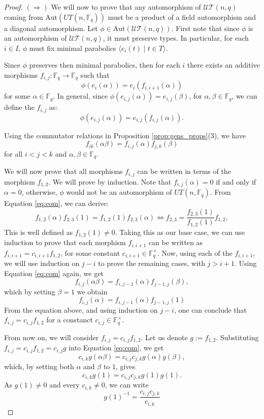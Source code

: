 \documentclass[11pt,letterpaper]{amsart}
\newcommand{\TT}{\mathcal{T}}
\newcommand{\Aut}{\mathrm{Aut}}
\newcommand{\FF}{\mathbb{F}}
\newcommand{\UU}{\mathcal{U}}
\begin{document}
\begin{proof}
$(\Rightarrow)$  We will now to prove that any automorphism of $\UU\TT(n,q)$ coming from $\Aut(UT(n,\FF_q))$ must be a product of a field automorphism and a diagonal automorphism. Let $\phi\in \Aut(\UU\TT(n,q))$. First note that since $\phi$ is an automorphism of $\UU\TT(n,q)$, it must preserve types. In particular, for each $i\in I$, $\phi$ must fix minimal parabolics $\langle e_i(t)\mid t\in T\rangle$.

Since $\phi$ preserves then minimal parabolics, then for each $i$ there exists an additive morphisms $f_{i,j}:\FF_q\to \FF_q$ such that 
$$
\phi(e_i(\alpha))=e_i(f_{i,i+1}(\alpha))
$$
for some $\alpha\in \FF_q$.
In general, since $\phi(e_{i,j}(\alpha))=e_{i,j}(\beta)$, for $\alpha,\beta\in \FF_q$, we can define the $f_{i,j}$ as:
$$
\phi(e_{i,j}(\alpha))=e_{i,j}(f_{i,j}(\alpha)).
$$

Using the commutator relations in Proposition \ref{prop:gens_props}(3), we have
\begin{equation}\label{eq:com}
  f_{ik}(\alpha \beta)=f_{i,j}(\alpha)f_{j,k}(\beta)  
\end{equation}
for all $i<j<k$ and $\alpha,\beta\in\FF_q$.

We will now prove that all morphisms $f_{i,j}$ can be written in terms of the morphism $f_{1,2}$.
We will prove by induction. Note that $f_{i,j}(\alpha) = 0$ if and only if $\alpha = 0$, otherwise, $\phi$ would not be an automorphism of $UT(n,\FF_q)$.
From Equation \ref{eq:com}, we can derive:
$$
f_{1,2}(\alpha)f_{2,3}(1)=f_{1,2}(1)f_{2,3}(\alpha) \Leftrightarrow f_{2,3}=\frac{f_{2,3}(1)}{f_{1,2}(1)}f_{1,2},
$$
This is well defined as $f_{1,2}(1)\neq 0$. Taking this as our base case, we can use induction to prove that each morphism $f_{i,i+1}$ can be written as $f_{i,i+1} = c_{i,i+1} f_{1,2}$, for some constant $c_{i,i+1}\in \FF_q^\times$. 
Now, using each of the $f_{i,i+1}$, we will use induction on $j-i$ to prove the remaining cases, with $j>i+1$. Using Equation \ref{eq:com} again, we get
$$
f_{i,j}(\alpha \beta)=f_{i,j-1}(\alpha)f_{j-1,j}(\beta),
$$
which by setting $\beta=1$ we obtain
$$
f_{i,j}(\alpha)=f_{i,j-1}(\alpha)f_{j-1,j}(1)
$$
From the equation above, and using induction on $j-i$, one can conclude that $f_{i,j}=c_{i,j}f_{1,2}$ for a constanct $c_{i,j}\in \FF_q^\times$.

From now on, we will consider  $f_{i,j}=c_{i,j}f_{1,2}$. Let us denote $g := f_{1,2}$. Substituting $f_{i,j}=c_{i,j}f_{1,2} = c_{i,j}g$ into Equation \ref{eq:com}, we get
\begin{equation}\label{eq:constant}
c_{i,k}g(\alpha\beta)=c_{i,j}c_{j,k}g(\alpha)g(\beta),
\end{equation}
which, by setting both $\alpha$ and $\beta$ to $1$, gives
$$
c_{i,k}g(1)=c_{i,j}c_{j,k}g(1)g(1).
$$
As $g(1)\neq 0$ and every $c_{i,k}\neq 0$, we can write
$$
g(1)^{-1}=\frac{c_{i,j}c_{j,k}}{c_{i,k}}
$$


\end{proof}
\end{document}
